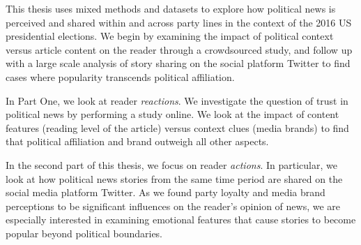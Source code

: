 \def\abstractpage{\cleardoublepage
\begin{center}{\large{\bf \@title} \\
by \\
\@author \\[\baselineskip]}
\par
\def\baselinestretch{1}\@normalsize
Submitted to the \@department, \\
\@school \\
on \@thesisdate, in partial fulfillment of the \\
requirements for the \@degreeword\ of \\
\@degree
\end{center}
\par
\begin{abstract}}
This thesis uses mixed methods and datasets to explore how political news is perceived and shared within and across party lines in the context of the 2016 US presidential elections. We begin by examining the impact of political context versus article content on the reader through a crowdsourced study, and follow up with a large scale analysis of story sharing on the social platform Twitter to find cases where popularity transcends political affiliation.
 
In Part One, we look at reader \emph{reactions}. We investigate the question of trust in political news by performing a study online. We look at the impact of content features (reading level of the article) versus context clues (media brands) to find that political affiliation and brand outweigh all other aspects.


In the second part of this thesis, we focus on reader \emph{actions}.  In particular, we look at how political news stories from the same time period are shared on the social media platform Twitter. As we found party loyalty and media brand perceptions to be significant influences on the reader's opinion of news, we are especially interested in examining emotional features that cause stories to become popular beyond political boundaries. 

